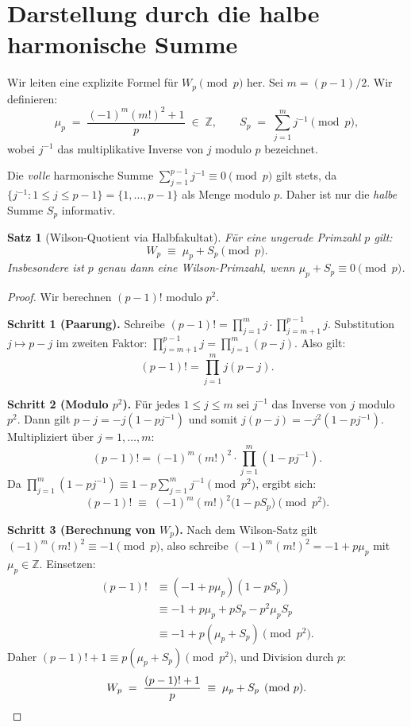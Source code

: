\documentclass[12pt,a4paper]{amsart}
\newtheorem{theorem}{Satz}[section]
\theoremstyle{definition}
\newcommand{\Z}{\mathbb{Z}}
\begin{document}
\section{Darstellung durch die halbe harmonische Summe}

Wir leiten eine explizite Formel für $W_p \pmod p$ her.
Sei $m = (p-1)/2$.  Wir definieren:
\[
  \mu_p \;=\; \frac{(-1)^m (m!)^2 + 1}{p} \;\in\; \Z,
  \qquad
  S_p \;=\; \sum_{j=1}^{m} j^{-1} \pmod p,
\]
wobei $j^{-1}$ das multiplikative Inverse von $j$ modulo $p$ bezeichnet.

\begin{remark}
  Die \emph{volle} harmonische Summe $\sum_{j=1}^{p-1} j^{-1} \equiv 0 \pmod{p}$
  gilt stets, da $\{j^{-1} \colon 1 \leq j \leq p-1\} = \{1, \ldots, p-1\}$
  als Menge modulo $p$.  Daher ist nur die \emph{halbe} Summe $S_p$ informativ.
\end{remark}

\begin{theorem}[Wilson-Quotient via Halbfakultat]\label{satz:harmonisch}
  Für eine ungerade Primzahl $p$ gilt:
  \[
    W_p \;\equiv\; \mu_p + S_p \pmod{p}.
  \]
  Insbesondere ist $p$ genau dann eine Wilson-Primzahl, wenn
  $\mu_p + S_p \equiv 0 \pmod{p}$.
\end{theorem}

\begin{proof}
  Wir berechnen $(p-1)!$ modulo $p^2$.

  \textbf{Schritt 1 (Paarung).}
  Schreibe $(p-1)! = \prod_{j=1}^m j \cdot \prod_{j=m+1}^{p-1} j$.
  Substitution $j \mapsto p-j$ im zweiten Faktor:
  $\prod_{j=m+1}^{p-1} j = \prod_{j=1}^m (p-j)$.
  Also gilt:
  \[
    (p-1)! = \prod_{j=1}^m j(p-j).
  \]

  \textbf{Schritt 2 (Modulo $p^2$).}
  Für jedes $1 \leq j \leq m$ sei $j^{-1}$ das Inverse von $j$ modulo $p^2$.
  Dann gilt $p - j = -j(1 - pj^{-1})$ und somit $j(p-j) = -j^2(1-pj^{-1})$.
  Multipliziert über $j = 1, \ldots, m$:
  \[
    (p-1)! = (-1)^m (m!)^2 \cdot \prod_{j=1}^m (1 - pj^{-1}).
  \]
  Da $\prod_{j=1}^m (1-pj^{-1}) \equiv 1 - p\sum_{j=1}^m j^{-1} \pmod{p^2}$,
  ergibt sich:
  \[
    (p-1)! \;\equiv\; (-1)^m(m!)^2 \bigl(1 - pS_p\bigr) \pmod{p^2}.
  \]

  \textbf{Schritt 3 (Berechnung von $W_p$).}
  Nach dem Wilson-Satz gilt $(-1)^m(m!)^2 \equiv -1 \pmod{p}$,
  also schreibe $(-1)^m(m!)^2 = -1 + p\mu_p$ mit $\mu_p \in \Z$.
  Einsetzen:
  \begin{align*}
    (p-1)! &\equiv (-1+p\mu_p)(1-pS_p)\\
           &\equiv -1 + p\mu_p + pS_p - p^2\mu_pS_p\\
           &\equiv -1 + p(\mu_p + S_p) \pmod{p^2}.
  \end{align*}
  Daher $(p-1)! + 1 \equiv p(\mu_p + S_p) \pmod{p^2}$, und Division durch $p$:
  \[
    W_p \;=\; \frac{(p-1)!+1}{p} \;\equiv\; \mu_p + S_p \pmod p. \qedhere
  \]
\end{proof}
\end{document}
